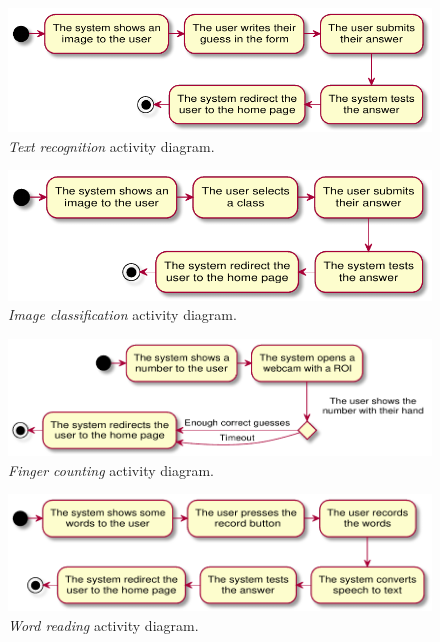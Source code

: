 \begin{figure}[h!t]
    \centering
    \includegraphics[scale=0.8]{assets/plantuml/pdf/text.pdf}
    \caption{\emph{Text recognition} activity diagram.}
    \label{fig:activity:text}
\end{figure}

\begin{figure}[h!t]
    \centering
    \includegraphics[scale=0.8]{assets/plantuml/pdf/image.pdf}
    \caption{\emph{Image classification} activity diagram.}
    \label{fig:activity:image}
\end{figure}

\begin{figure}[h!t]
    \centering
    \includegraphics[scale=0.8]{assets/plantuml/pdf/finger.pdf}
    \caption{\emph{Finger counting} activity diagram.}
    \label{fig:activity:finger}
\end{figure}

\begin{figure}[h!t]
    \centering
    \includegraphics[scale=0.8]{assets/plantuml/pdf/word.pdf}
    \caption{\emph{Word reading} activity diagram.}
    \label{fig:activity:word}
\end{figure}

